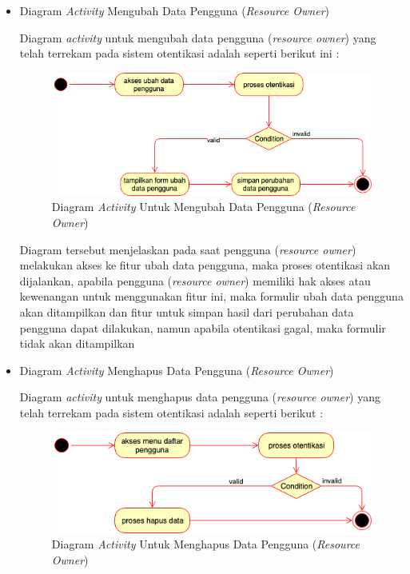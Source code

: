 \documentclass[pdftex,12pt, oneside]{article}
\begin{document}
\begin{itemize}
	\item Diagram \textit{Activity} Mengubah Data Pengguna (\textit{Resource Owner})
	
		Diagram \textit{activity} untuk mengubah data pengguna (\textit{resource owner}) yang telah terrekam pada sistem otentikasi adalah seperti berikut ini :
		
		\begin{figure}[H]
			\centering
			\includegraphics[width=1\textwidth]{./resources/act-dia-edit-user}
			\caption{Diagram \textit{Activity} Untuk Mengubah Data Pengguna (\textit{Resource Owner})}
			\label{fig:act-dia-edit-user}
		\end{figure}
		
		Diagram tersebut menjelaskan pada saat pengguna (\textit{resource owner}) melakukan akses ke fitur ubah data pengguna, maka proses otentikasi akan dijalankan, apabila pengguna (\textit{resource owner}) memiliki hak akses atau kewenangan untuk menggunakan fitur ini, maka formulir ubah data pengguna akan ditampilkan dan fitur untuk simpan hasil dari perubahan data pengguna dapat dilakukan, namun apabila otentikasi gagal, maka formulir tidak akan ditampilkan
	
	\item Diagram \textit{Activity} Menghapus Data Pengguna (\textit{Resource Owner})
	
	Diagram \textit{activity} untuk menghapus data pengguna (\textit{resource owner}) yang telah terrekam pada sistem otentikasi adalah seperti berikut :
	
	\begin{figure}[H]
		\centering
		\includegraphics[width=1\textwidth]{./resources/act-dia-remove-user}
		\caption{Diagram \textit{Activity} Untuk Menghapus Data Pengguna (\textit{Resource Owner})}
		\label{fig:act-dia-remove-user}
	\end{figure}	
	

\end{itemize}
\end{document}
